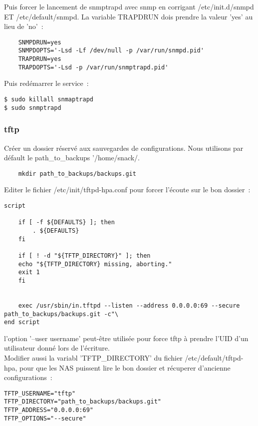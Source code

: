 Puis forcer le lancement de snmptrapd avec snmp en corrigant /etc/init.d/snmpd {\color{red}ET} /etc/default/snmpd. La variable TRAPDRUN dois prendre la valeur 'yes' au lieu de 'no'~:

\begin{lstlisting}
    SNMPDRUN=yes
    SNMPDOPTS='-Lsd -Lf /dev/null -p /var/run/snmpd.pid'
    TRAPDRUN=yes
    TRAPDOPTS='-Lsd -p /var/run/snmptrapd.pid'
\end{lstlisting}

Puis redémarrer le service~:

\begin{lstlisting}
$ sudo killall snmaptrapd
$ sudo snmptrapd 
\end{lstlisting}

\subsubsection{tftp}

Créer un dossier réservé aux sauvegardes de configurations. Nous utilisons par défault le path\_to\_backups '/home/snack/.

\begin{lstlisting}
    mkdir path_to_backups/backups.git
\end{lstlisting}


Editer le fichier /etc/init/tftpd-hpa.conf pour forcer l'écoute sur le bon dossier~:

\begin{lstlisting}
script

    if [ -f ${DEFAULTS} ]; then
        . ${DEFAULTS}
    fi
    
    if [ ! -d "${TFTP_DIRECTORY}" ]; then
	echo "${TFTP_DIRECTORY} missing, aborting."
	exit 1
    fi
    
    
    exec /usr/sbin/in.tftpd --listen --address 0.0.0.0:69 --secure path_to_backups/backups.git -c"\
end script
\end{lstlisting}
l'option '--user username' peut-être utilisée pour force tftp à prendre l'UID d'un utilisateur donné lors de l'écriture.\\

Modifier aussi la variabl 'TFTP\_DIRECTORY' du fichier /etc/default/tftpd-hpa, pour que les NAS puissent lire le bon dossier et récuperer d'ancienne configurations~:
\begin{lstlisting}
TFTP_USERNAME="tftp"
TFTP_DIRECTORY="path_to_backups/backups.git"
TFTP_ADDRESS="0.0.0.0:69"
TFTP_OPTIONS="--secure"
\end{lstlisting}

